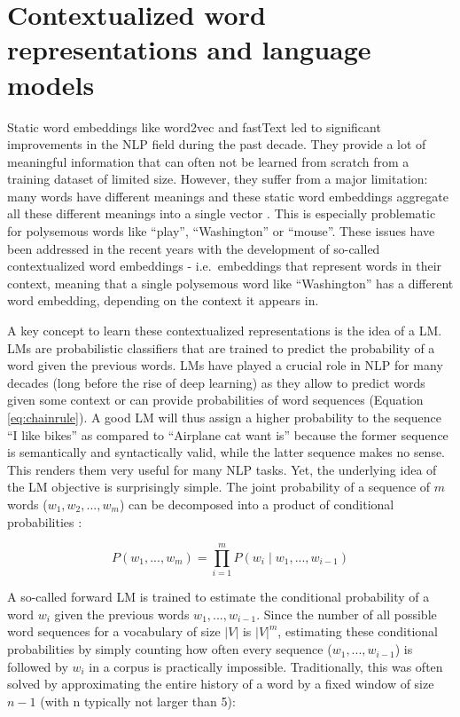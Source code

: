 \documentclass[12pt,a4paper,]{book}
\begin{document}
\hypertarget{contextualized-word-representations-and-language-models}{%
\section{Contextualized word representations and language models}\label{contextualized-word-representations-and-language-models}}

Static word embeddings like word2vec and fastText led to significant improvements in the NLP field during the past decade. They provide a lot of meaningful information that can often not be learned from scratch from a training dataset of limited size. However, they suffer from a major limitation: many words have different meanings and these static word embeddings aggregate all these different meanings into a single vector \citep{arora2018}. This is especially problematic for polysemous words like ``play'', ``Washington'' or ``mouse''. These issues have been addressed in the recent years with the development of so-called contextualized word embeddings - i.e.~embeddings that represent words in their context, meaning that a single polysemous word like ``Washington'' has a different word embedding, depending on the context it appears in.

A key concept to learn these contextualized representations is the idea of a LM. LMs are probabilistic classifiers that are trained to predict the probability of a word given the previous words. LMs have played a crucial role in NLP for many decades (long before the rise of deep learning) as they allow to predict words given some context or can provide probabilities of word sequences (Equation \eqref{eq:chainrule}). A good LM will thus assign a higher probability to the sequence ``I like bikes'' as compared to ``Airplane cat want is'' because the former sequence is semantically and syntactically valid, while the latter sequence makes no sense. This renders them very useful for many NLP tasks. Yet, the underlying idea of the LM objective is surprisingly simple. The joint probability of a sequence of \(m\) words (\({w_1, w_2, ..., w_m}\)) can be decomposed into a product of conditional probabilities \citep{jurafsky2019}:

\begin{equation}
P\left(w_1, ..., w_m\right) = \prod_{i=1}^m P\left(w_i\mid w_1, ..., w_{i-1}\right)
\label{eq:chainrule}
\end{equation}

A so-called forward LM is trained to estimate the conditional probability of a word \(w_i\) given the previous words \({w_1,..., w_{i-1}}\). Since the number of all possible word sequences for a vocabulary of size \(|V|\) is \(|V|^m\), estimating these conditional probabilities by simply counting how often every sequence (\(w_1,..., w_{i-1}\)) is followed by \(w_i\) in a corpus is practically impossible. Traditionally, this was often solved by approximating the entire history of a word by a fixed window of size \(n - 1\) (with n typically not larger than 5):
\end{document}
